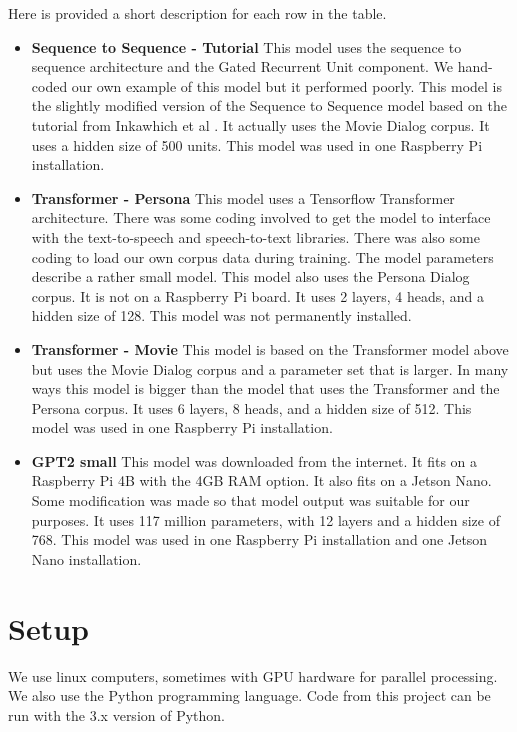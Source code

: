 Here is provided a short description for each row in the table.

\begin{itemize}
	\item \textbf{Sequence to Sequence - Tutorial} This model uses the sequence to sequence architecture and the Gated Recurrent Unit component. We hand-coded our own example of this model but it performed poorly. This model is the slightly modified version of the Sequence to Sequence model based on the tutorial from Inkawhich et al \cite{2018Inkawhich}. It actually uses the Movie Dialog corpus. It uses a hidden size of 500 units. This model was used in one Raspberry Pi installation.
	
	\item \textbf{Transformer - Persona} This model uses a Tensorflow Transformer architecture. There was some coding involved to get the model to interface with the text-to-speech and speech-to-text libraries. There was also some coding to load our own corpus data during training. The model parameters describe a rather small model. This model also uses the Persona Dialog corpus. It is not on a Raspberry Pi board. It uses 2 layers, 4  heads, and a hidden size of 128. This model was not permanently installed.
	
	\item \textbf{Transformer - Movie} This model is based on the Transformer model above but uses the Movie Dialog corpus and a parameter set that is larger. In many ways this model is bigger than the model that uses the Transformer and the Persona corpus. It uses 6 layers, 8 heads, and a hidden size of 512. This model was used in one Raspberry Pi installation.
	
	\item \textbf{GPT2 small} This model was downloaded from the internet. It fits on a Raspberry Pi 4B with the 4GB RAM option. It also fits on a Jetson Nano. Some modification was made so that model output was suitable for our purposes. It uses 117 million parameters, with 12 layers and a hidden size of 768. This model was used in one Raspberry Pi installation and one Jetson Nano installation.
\end{itemize}



\section{Setup}

We use linux computers, sometimes with \ac{GPU} hardware for parallel processing. We also use the Python programming language. Code from this project can be run with the 3.x version of Python.

